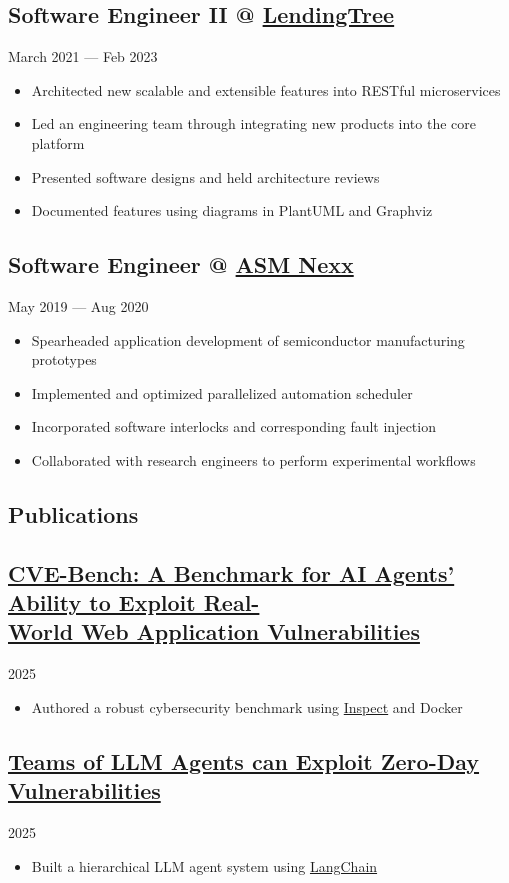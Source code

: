 \documentclass[11pt, letterpaper]{article}
\newcommand{\datedsubsection}[2]{
    \titleformat{\subsection}[runin]{\normalfont\normalsize\bfseries}{\thesection}{}{}
    \subsection*{#1}
    \hfill#2
    \titleformat{\subsection}[hang]{\normalfont\normalsize\bfseries}{\thesection}{}{}
}
\begin{document}
\datedsubsection{Software Engineer II @ \href{https://www.crunchbase.com/organization/lendingtree}{LendingTree}}{March 2021 --- Feb 2023}
\begin{itemize}
    \item Architected new scalable and extensible features into RESTful microservices
    \item Led an engineering team through integrating new products into the core platform
    \item Presented software designs and held architecture reviews
    \item Documented features using diagrams in PlantUML and Graphviz
\end{itemize}

\datedsubsection{Software Engineer @ \href{https://www.crunchbase.com/organization/asm-nexx}{ASM Nexx}}{May 2019 --- Aug 2020}
\begin{itemize}
    \item Spearheaded application development of semiconductor manufacturing prototypes
    \item Implemented and optimized parallelized automation scheduler
    \item Incorporated software interlocks and corresponding fault injection
    \item Collaborated with research engineers to perform experimental workflows
\end{itemize}

\textcolor{header}{\section*{Publications}}\label{sec:publications}

\datedsubsection{\href{https://arxiv.org/abs/2503.17332}{CVE-Bench: A Benchmark for AI Agents' Ability to Exploit Real-\\ World Web Application Vulnerabilities}}{2025}
\begin{itemize}
    \item Authored a robust cybersecurity benchmark using \href{https://inspect.aisi.org.uk/}{Inspect} and Docker
\end{itemize}

\datedsubsection{\href{https://arxiv.org/abs/2406.01637}{Teams of LLM Agents can Exploit Zero-Day Vulnerabilities}}{2025}
\begin{itemize}
    \item Built a hierarchical LLM agent system using \href{https://www.langchain.com/}{LangChain}
\end{itemize}
\end{document}
